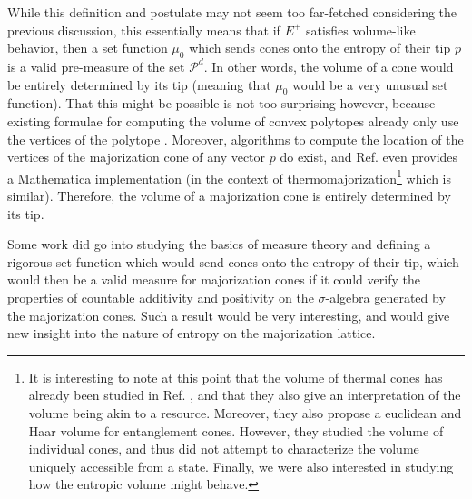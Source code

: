 While this definition and postulate may not seem too far-fetched considering the previous discussion, this essentially means that if $E^+$ satisfies volume-like behavior, then a set function $\mu_0$ which sends cones onto the entropy of their tip $p$ is a valid pre-measure of the set $\mathcal{P}^d$. In other words, the volume of a cone would be entirely determined by its tip (meaning that $\mu_0$ would be a very unusual set function). That this might be possible is not too surprising however, because existing formulae for computing the volume of convex polytopes already only use the vertices of the polytope \cite{braden_surveyors_1986}. Moreover, algorithms to compute the location of the vertices of the majorization cone of any vector $p$ do exist, and Ref. \cite{junior_thermalcones_2022} even provides a Mathematica implementation (in the context of thermomajorization\footnote{It is interesting to note at this point that the volume of thermal cones has already been studied in Ref. \cite{junior_geometric_2022}, and that they also give an interpretation of the volume being akin to a resource. Moreover, they also propose a euclidean and Haar volume for entanglement cones. However, they studied the volume of individual cones, and thus did not attempt to characterize the volume uniquely accessible from a state. Finally, we were also interested in studying how the entropic volume might behave.} which is similar). Therefore, the volume of a majorization cone is entirely determined by its tip.

Some work did go into studying the basics of measure theory and defining a rigorous set function which would send cones onto the entropy of their tip, which would then be a valid measure for majorization cones if it could verify the properties of countable additivity and positivity on the $\sigma$-algebra generated by the majorization cones. Such a result would be very interesting, and would give new insight into the nature of entropy on the majorization lattice.

